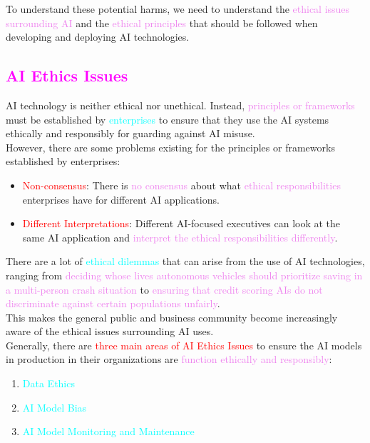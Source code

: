 \documentclass{book}
\begin{document}
To understand these potential harms, we need to understand the \textcolor{violet}{ethical issues surrounding AI} and the \textcolor{violet}{ethical principles} that should be followed when developing and deploying AI technologies.\\
\textcolor{magenta}{\section{\textbf{AI Ethics Issues}}}
AI technology is neither ethical nor unethical. Instead, \textcolor{violet}{principles or frameworks} must be established by \textcolor{cyan}{enterprises} to ensure that they use the AI systems ethically and responsibly for guarding against AI misuse.\\
However, there are some problems existing for the principles or frameworks established by enterprises:
\begin{itemize}
    \item \textcolor{red}{Non-consensus}: There is \textcolor{violet}{no consensus} about what \textcolor{violet}{ethical responsibilities} enterprises have for different AI applications.
    \item \textcolor{red}{Different Interpretations}: Different AI-focused executives can look at the same AI application and \textcolor{violet}{interpret the ethical responsibilities differently}.
\end{itemize}
There are a lot of \textcolor{cyan}{ethical dilemmas} that can arise from the use of AI technologies, ranging from \textcolor{violet}{deciding whose lives autonomous vehicles should prioritize saving in a multi-person crash situation} to \textcolor{violet}{ensuring that credit scoring AIs do not discriminate against certain populations unfairly}.\\
\vspace{2mm}
This makes the general public and business community become increasingly aware of the ethical issues surrounding AI uses.\\
Generally, there are \textcolor{red}{three main areas of AI Ethics Issues} to ensure the AI models in production in their organizations are \textcolor{violet}{function ethically and responsibly}:
\begin{enumerate}
    \item \textcolor{cyan}{Data Ethics}
    \item \textcolor{cyan}{AI Model Bias}
    \item \textcolor{cyan}{AI Model Monitoring and Maintenance}
\end{enumerate}
\newpage
\end{document}
